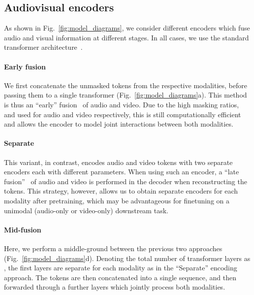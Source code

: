 \documentclass[10pt,twocolumn,letterpaper]{article}
\def \paravspace {-1\baselineskip}
\begin{document}
\subsection{Audiovisual encoders}
\label{sec:method_encoders}
\vspace{-1mm}

As shown in Fig.~\ref{fig:model_diagrams}, we consider different encoders which fuse audio and visual information at different stages. In all cases, we use the standard transformer architecture~\cite{dosovitskiy_iclr_2021,vaswani_neurips_2017}.

\vspace{\paravspace}
\paragraph{Early fusion}
We first concatenate the unmasked tokens from the respective modalities, before passing them to a single transformer (Fig.~\ref{fig:model_diagrams}a).
This method is thus an ``early'' fusion~\cite{karpathy_cvpr_2014} of audio and video.
Due to the high masking ratios,  and  used for audio and video respectively, this is still computationally efficient and allows the encoder to model joint interactions between both modalities.

\vspace{\paravspace}
\paragraph{Separate}
This variant, in contrast, encodes audio and video tokens with two separate encoders each with different parameters.
When using such an encoder, a ``late fusion''~\cite{karpathy_cvpr_2014,simonyan_neurips_2014} of audio and video is performed in the decoder when reconstructing the tokens.
This strategy, however, allows us to obtain separate encoders for each modality after pretraining, which may be advantageous for finetuning on a unimodal (\ie audio-only or video-only) downstream task.

\vspace{\paravspace}
\paragraph{Mid-fusion}
Here, we perform a middle-ground between the previous two approaches (Fig.~\ref{fig:model_diagrams}d).
Denoting the total number of transformer layers as , the first  layers are separate for each modality as in the ``Separate'' encoding approach.
The tokens are then concatenated into a single sequence, and then forwarded through a further  layers which jointly process both modalities.
\end{document}
